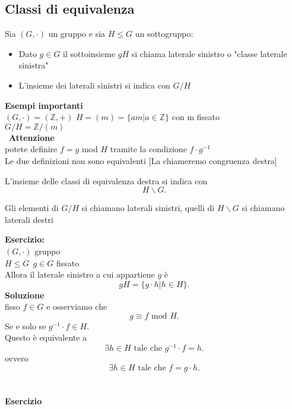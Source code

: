 \documentclass[12px]{article}
\begin{document}
{\subsection{Classi di equivalenza}
	\begin{nota}
		Sia $(G,\cdot)$ un gruppo e sia $H\leq G$ un sottogruppo:\\
	\begin{itemize}
		\item Dato $g\in G$ il sottoinsieme  $gH$ si chiama laterale sinistro o "classe laterale sinistra"
		\item L'insieme dei laterali sinistri si indica con $G/H$
	\end{itemize}
	\end{nota}
	\textbf{Esempi importanti}\\
	$(G,\cdot) = (\mathbb Z, +)$
	$H = (m) = \lbrace a m | a\in \mathbb Z\rbrace$ con m fissato\\
	 $G/H = \mathbb Z/(m)$ \\\
	 \textbf{Attenzione}\\
	 potete definire $f = g$ mod $H$ tramite la condizione  $f\cdot g^{-1}$ \\
	 Le due definizioni non sono equivalenti [La chiameremo congruenza destra]\\
	 \begin{nota}
	L'insieme delle classi di equivalenza destra si indica con
	\[
		H\backslash G
	.\] 
	 \end{nota}
	 \begin{defi}
	 	Gli elementi di $G/H$ si chiamano laterali sinistri, quelli di  $H\backslash G$ si chiamano laterali destri
	 \end{defi}
	 \textbf{Esercizio:}\\
	 $(G,\cdot)$ gruppo\\
	 $H\leq G \ \ g\in G$ fissato\\
	 Allora il laterale sinistro a cui appartiene  $g$ è\\ \[
	 gH = \lbrace g\cdot h | h\in H\rbrace
	 .\] 
	 \textbf{Soluzione}\\
	 fisso $f\in G$ e osserviamo che  \[
		 g\equiv f \text{ mod } H
	 .\] 
	 Se e solo se $g^{-1}\cdot f\in H$.\\
	 Questo è equivalente a 
	  \[
		  \exists h\in H \text{ tale che } g^{-1}\cdot f=h
	 .\] 
	 ovvero
	 \[
		 \exists h\in H \text{ tale che } f = g\cdot h
	 .\] 
	 \ \\ \hline \ \\ 
 \textbf{Esercizio}\\
}
\end{document}
